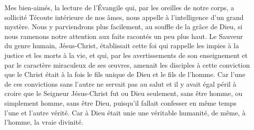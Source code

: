Mes bien-aimés, la lecture de l’Évangile qui, par les oreilles de notre corps, a sollicité Técoute intérieure de nos âmes, nous appelle à l’intelligence d’un grand mystère. Nous y parviendrons plus facilement, au souffle de la grâce de Dieu, si nous ramenons notre attention aux faits racontés un peu plus haut. Le Sauveur du genre humain, Jésus-Christ, établissait cette foi qui rappelle les impies à la justice et les morts à la vie, et qui, par les avertissements de son enseignement et par le caractère miraculeux de ses œuvres, amenait les disciples à cette conviction que le Christ était à la fois le fils unique de Dieu et le fils de l’homme. Car l’une de ces convictions sans l’autre ne servait pas au salut et il y avait égal péril à croire que le Seigneur Jésus-Christ fut ou Dieu seulement, sans être homme, ou simplement homme, sans être Dieu, puisqu’il fallait confesser en même temps l’une et l’autre vérité. Car à Dieu était unie une véritable humanité, de même, à l’homme, la vraie divinité.
